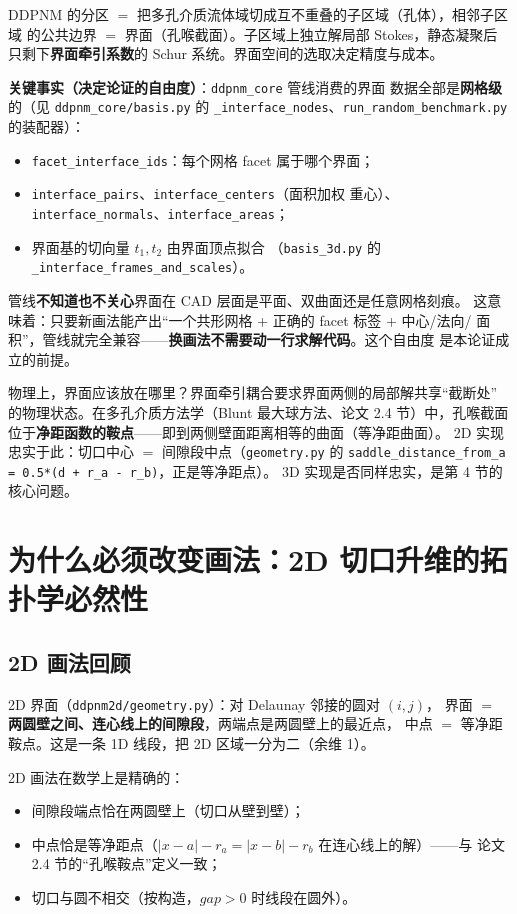 \documentclass[11pt]{ctexart}
\begin{document}
DDPNM 的分区 $=$ 把多孔介质流体域切成互不重叠的子区域（孔体），相邻子区域
的公共边界 $=$ 界面（孔喉截面）。子区域上独立解局部 Stokes，静态凝聚后
只剩下\textbf{界面牵引系数}的 Schur 系统。界面空间的选取决定精度与成本。

\textbf{关键事实（决定论证的自由度）}：\texttt{ddpnm\_core} 管线消费的界面
数据全部是\textbf{网格级}的（见 \texttt{ddpnm\_core/basis.py} 的
\texttt{\_interface\_nodes}、\texttt{run\_random\_benchmark.py} 的装配器）：
\begin{itemize}
  \item \texttt{facet\_interface\_ids}：每个网格 facet 属于哪个界面；
  \item \texttt{interface\_pairs}、\texttt{interface\_centers}（面积加权
  重心）、\texttt{interface\_normals}、\texttt{interface\_areas}；
  \item 界面基的切向量 $t_1,t_2$ 由界面顶点拟合
  （\texttt{basis\_3d.py} 的 \texttt{\_interface\_frames\_and\_scales}）。
\end{itemize}

管线\textbf{不知道也不关心}界面在 CAD 层面是平面、双曲面还是任意网格刻痕。
这意味着：只要新画法能产出``一个共形网格 + 正确的 facet 标签 + 中心/法向/
面积''，管线就完全兼容——\textbf{换画法不需要动一行求解代码}。这个自由度
是本论证成立的前提。

物理上，界面应该放在哪里？界面牵引耦合要求界面两侧的局部解共享``截断处''
的物理状态。在多孔介质方法学（Blunt 最大球方法、论文 2.4 节）中，孔喉截面
位于\textbf{净距函数的鞍点}——即到两侧壁面距离相等的曲面（等净距曲面）。
2D 实现忠实于此：切口中心 $=$ 间隙段中点（\texttt{geometry.py} 的
\texttt{saddle\_distance\_from\_a = 0.5*(d + r\_a - r\_b)}，正是等净距点）。
3D 实现是否同样忠实，是第 4 节的核心问题。

\section{为什么必须改变画法：2D 切口升维的拓扑学必然性}

\subsection{2D 画法回顾}

2D 界面（\texttt{ddpnm2d/geometry.py}）：对 Delaunay 邻接的圆对 $(i,j)$，
界面 $=$ \textbf{两圆壁之间、连心线上的间隙段}，两端点是两圆壁上的最近点，
中点 $=$ 等净距鞍点。这是一条 1D 线段，把 2D 区域一分为二（余维 1）。

2D 画法在数学上是精确的：
\begin{itemize}
  \item 间隙段端点恰在两圆壁上（切口从壁到壁）；
  \item 中点恰是等净距点（$|x-a|-r_a = |x-b|-r_b$ 在连心线上的解）——与
  论文 2.4 节的``孔喉鞍点''定义一致；
  \item 切口与圆不相交（按构造，$gap>0$ 时线段在圆外）。
\end{itemize}
\end{document}
